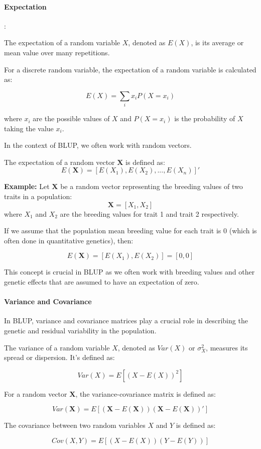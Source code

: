 \documentclass[12pt,a4paper]{article}
\newenvironment{greenbox}[1][]
{\begin{basebox}[linecolor=uqgreen]
\textbf{\color{uqgreen}#1}\par\noindent\ignorespaces}
{\end{basebox}}
\begin{document}
\paragraph{Expectation}:

The expectation of a random variable $X$, denoted as $E(X)$, is its average or mean value over many repetitions. 

\begin{greenbox}
For a discrete random variable, the expectation of a random variable is calculated as:

$$E(X) = \sum_i x_i P(X = x_i)$$

where $x_i$ are the possible values of $X$ and $P(X = x_i)$ is the probability of $X$ taking the value $x_i$.
\end{greenbox}

In the context of BLUP, we often work with random vectors. 

\begin{greenbox}
    
The expectation of a random vector $\mathbf{X}$ is defined as:
$$E(\mathbf{X}) = [E(X_1), E(X_2), ..., E(X_n)]'$$
\end{greenbox}

\textbf{Example:}
Let $\mathbf{X}$ be a random vector representing the breeding values of two traits in a population:
$$\mathbf{X} = [X_1, X_2]$$
where $X_1$ and $X_2$ are the breeding values for trait 1 and trait 2 respectively. 

If we assume that the population mean breeding value for each trait is 0 (which is often done in quantitative genetics), then:

$$E(\mathbf{X}) = [E(X_1), E(X_2)] = [0, 0]$$ 

This concept is crucial in BLUP as we often work with breeding values and other genetic effects that are assumed to have an expectation of zero.

\paragraph{Variance and Covariance}

\leavevmode\vspace{1pt} %

In BLUP, variance and covariance matrices play a crucial role in describing the genetic and residual variability in the population.

\begin{greenbox}
    The variance of a random variable $X$, denoted as $Var(X)$ or $\sigma^2_X$, measures its spread or dispersion. It's defined as:

$$Var(X) = E[(X - E(X))^2]$$

For a random vector $\mathbf{X}$, the variance-covariance matrix is defined as:

$$Var(\mathbf{X}) = E[(\mathbf{X} - E(\mathbf{X}))(\mathbf{X} - E(\mathbf{X}))']$$

The covariance between two random variables $X$ and $Y$ is defined as:

$$Cov(X,Y) = E[(X - E(X))(Y - E(Y))]$$
\end{greenbox}
\end{document}
